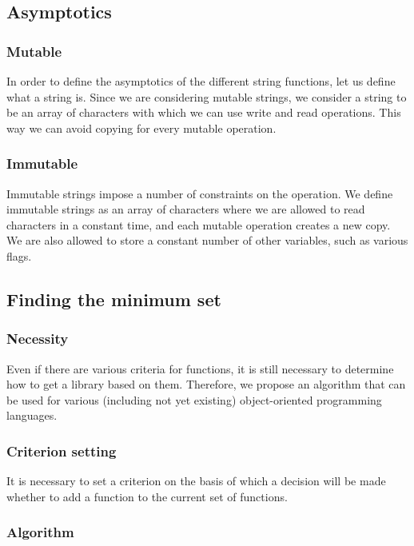 \documentclass[anonymous,sigplan,review,11pt,nonacm,natbib=false]{acmart}
\begin{document}
    \subsection{Asymptotics}

    \subsubsection{Mutable}

    In order to define the asymptotics of the different string functions, let us define what a string is. Since we are considering mutable strings, we consider a string to be an array of characters with which we can use write and read operations. This way we can avoid copying for every mutable operation.

    \subsubsection{Immutable}

    Immutable strings impose a number of constraints on the operation. We define immutable strings as an array of characters where we are allowed to read characters in a constant time, and each mutable operation creates a new copy. We are also allowed to store a constant number of other variables, such as various flags.

    \subsection{Finding the minimum set}

    \subsubsection{Necessity}

    Even if there are various criteria for functions, it is still necessary to determine how to get a library based on them. Therefore, we propose an algorithm that can be used for various (including not yet existing) object-oriented programming languages.

    \subsubsection{Criterion setting}

    It is necessary to set a criterion on the basis of which a decision will be made whether to add a function to the current set of functions.

    \subsubsection{Algorithm}
\end{document}
